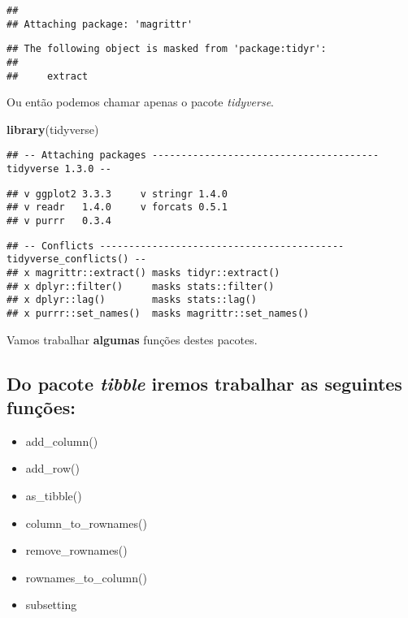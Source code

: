 \documentclass[]{book}
\newenvironment{Shaded}{\begin{snugshade}}{\end{snugshade}}
\newcommand{\KeywordTok}[1]{\textcolor[rgb]{0.13,0.29,0.53}{\textbf{#1}}}
\newcommand{\NormalTok}[1]{#1}
\providecommand{\tightlist}{%
  \setlength{\itemsep}{0pt}\setlength{\parskip}{0pt}}
\begin{document}
\begin{verbatim}
## 
## Attaching package: 'magrittr'
\end{verbatim}

\begin{verbatim}
## The following object is masked from 'package:tidyr':
## 
##     extract
\end{verbatim}

Ou então podemos chamar apenas o pacote \emph{tidyverse}.

\begin{Shaded}
\begin{Highlighting}[]
\KeywordTok{library}\NormalTok{(tidyverse)}
\end{Highlighting}
\end{Shaded}

\begin{verbatim}
## -- Attaching packages --------------------------------------- tidyverse 1.3.0 --
\end{verbatim}

\begin{verbatim}
## v ggplot2 3.3.3     v stringr 1.4.0
## v readr   1.4.0     v forcats 0.5.1
## v purrr   0.3.4
\end{verbatim}

\begin{verbatim}
## -- Conflicts ------------------------------------------ tidyverse_conflicts() --
## x magrittr::extract() masks tidyr::extract()
## x dplyr::filter()     masks stats::filter()
## x dplyr::lag()        masks stats::lag()
## x purrr::set_names()  masks magrittr::set_names()
\end{verbatim}

Vamos trabalhar \textbf{algumas} funções destes pacotes.

\hypertarget{do-pacote-tibble-iremos-trabalhar-as-seguintes-funuxe7uxf5es}{%
\subsection{\texorpdfstring{Do pacote \emph{tibble} iremos trabalhar as seguintes funções:}{Do pacote tibble iremos trabalhar as seguintes funções:}}\label{do-pacote-tibble-iremos-trabalhar-as-seguintes-funuxe7uxf5es}}

\begin{itemize}
\tightlist
\item
  add\_column()
\item
  add\_row()
\item
  as\_tibble()
\item
  column\_to\_rownames()
\item
  remove\_rownames()
\item
  rownames\_to\_column()
\item
  subsetting
\end{itemize}
\end{document}
